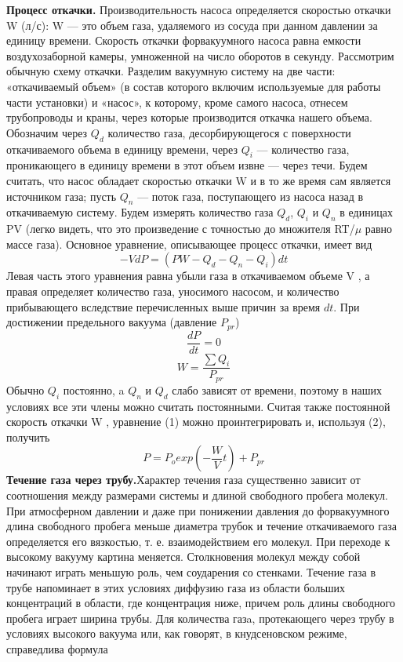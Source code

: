 \documentclass[11pt]{article}
\begin{document}
\newpage
\textbf{Процесс откачки.} Производительность насоса определяется скоростью откачки W (л/с): W — это объем газа, удаляемого из сосуда при данном давлении за единицу времени. Скорость откачки форвакуумного насоса равна емкости воздухозаборной камеры, умноженной на число оборотов в секунду.
Рассмотрим обычную схему откачки. Разделим вакуумную систему на две части: «откачиваемый объем» (в состав которого включим используемые для работы части установки) и «насос», к которому, кроме самого насоса, отнесем трубопроводы и краны, через которые
производится откачка нашего объема. Обозначим через $Q_d$ количество газа, десорбирующегося с поверхности откачиваемого объема в единицу времени, через $Q_i$ — количество газа, проникающего в единицу времени в этот объем извне — через течи. Будем считать, что насос обладает скоростью откачки W и в то же время сам является источником газа; пусть $Q_n$ — поток газа, поступающего из насоса назад в откачиваемую систему. Будем измерять количество газа $Q_d$, $Q_i$ и $Q_n$ в единицах PV (легко видеть, что это произведение с точностью до множителя RT/$\mu$ равно массе газа). Основное уравнение, описывающее процесс откачки, имеет вид
$$-VdP=(PW-Q_d-Q_n-Q_i)dt$$
Левая часть этого уравнения равна убыли газа в откачиваемом объеме V , а правая определяет количество газа, уносимого насосом, и количество прибывающего вследствие перечисленных выше причин
за время $dt$. При достижении предельного вакуума (давление $P_{pr}$)
$$\frac{dP}{dt}=0$$
$$W=\frac{\sum Q_i}{P_{pr}}$$
Обычно $Q_i$ постоянно, a $Q_n$ и $Q_d$ слабо зависят от времени, поэтому в наших условиях все эти члены можно считать постоянными. Считая также постоянной скорость откачки W , уравнение (1) можно проинтегрировать и, используя (2), получить
$$P=P_o exp(-\frac{W}{V}t) + P_{pr}$$
\textbf{Течение газа через трубу.}Характер течения газа существенно зависит от соотношения между размерами системы и длиной свободного пробега молекул. При атмосферном давлении и даже при понижении давления до форвакуумного длина свободного пробега меньше диаметра трубок и течение откачиваемого газа определяется его вязкостью, т. е. взаимодействием его молекул. При переходе к высокому вакууму картина меняется. Столкновения молекул между собой начинают играть меньшую роль, чем соударения со стенками. Течение газа в трубе напоминает в этих условиях диффузию газа из области больших концентраций в области, где концентрация ниже, причем роль длины свободного пробега играет ширина трубы.
Для количества газa, протекающего через трубу в условиях высокого вакуума или, как говорят, в кнудсеновском режиме, справедлива формула
\end{document}

